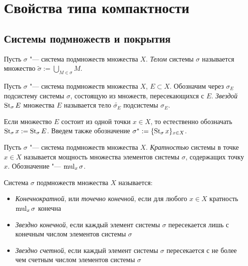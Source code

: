 \section{Свойства типа компактности}

\subsection{Системы подмножеств и покрытия}

\begin{definition}
    Пусть $\sigma$ "--- система подмножеств множества $X$. \textit{Телом} системы $\sigma$ называется множество $\widetilde{\sigma} := \bigcup_{M \in \sigma} M$.
\end{definition}

\begin{definition}
    Пусть $\sigma$ "--- система подмножеств множества $X$, $E \subset X$. Обозначим через $\sigma_E$ подсистему системы $\sigma$, состоящую из множеств, пересекающихся с $E$. \textit{Звездой} $\operatorname{St}_{\sigma}E$ множества $E$ называется тело $\widetilde{\sigma_E}$ подсистемы $\sigma_E$.
\end{definition}

\begin{note}
    Если множество $E$ состоит из одной точки $x \in X$, то естественно обозначать $\operatorname{St}_{\sigma}x := \operatorname{St}_{\sigma}E$. Введем также обозначение $\sigma^* := \{\operatorname{St}_{\sigma}x\}_{x \in X}$.
\end{note}

\pagebreak

\begin{definition}
    Пусть $\sigma$ "--- система подмножеств множества $X$. \textit{Кратностью} системы в точке $x\in X$ называется мощность множества элементов системы $\sigma$, содержащих точку $x$. Обозначение "--- $\operatorname{mul}_x \sigma$.
\end{definition}

\begin{definition}
    Система $\sigma$ подмножеств множества $X$ называется:
    \begin{itemize}
        \item \textit{Конечнократной}, или \textit{точечно конечной}, если для любого $x\in X$ кратность $\operatorname{mul}_x\sigma$ конечна
        
        \item \textit{Звездно конечной}, если каждый элемент системы $\sigma$ пересекается лишь с конечным числом элементов системы $\sigma$
        
        \item \textit{Звездно счетной}, если каждый элемент системы $\sigma$ пересекается с не более чем счетным числом элементов системы $\sigma$
    \end{itemize}
\end{definition}

